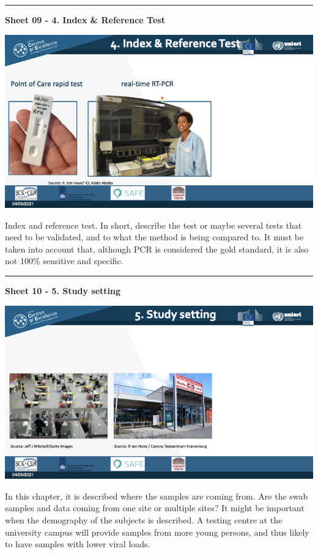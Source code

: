 \documentclass[
]{book}
\begin{document}
\begin{center}\rule{0.5\linewidth}{0.5pt}\end{center}

\textbf{Sheet 09 - 4. Index \& Reference Test}

\includegraphics{images/m03/m03_validation_of_test_kits_v2_2.009.jpeg}

Index and reference test. In short, describe the test or maybe several
tests that need to be validated, and to what the method is being
compared to. It must be taken into account that, although PCR is
considered the gold standard, it is also not 100\% sensitive and
specific.

\begin{center}\rule{0.5\linewidth}{0.5pt}\end{center}

\textbf{Sheet 10 - 5. Study setting}

\includegraphics{images/m03/m03_validation_of_test_kits_v2_2.010.jpeg}

In this chapter, it is described where the samples are coming from. Are
the swab samples and data coming from one site or multiple sites? It
might be important when the demography of the subjects is described. A
testing centre at the university campus will provide samples from more
young persons, and thus likely to have samples with lower viral loads.
\end{document}
